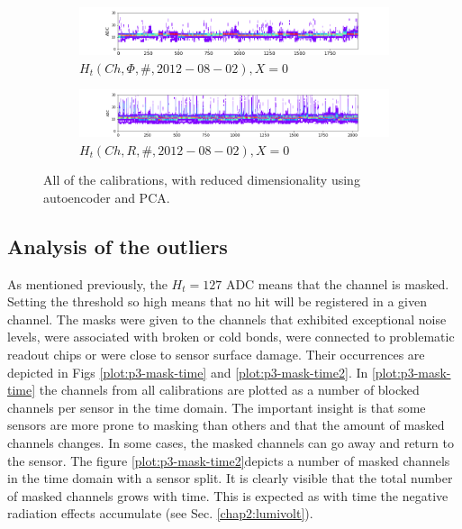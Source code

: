 \begin{figure}
    \centering
    
    \begin{subfigure}[b]{\textwidth}
    \includegraphics[width=\linewidth]{figures/chapter4/calib_analysis/P2-only-good-R.png}
    \caption{$H_t(Ch, \Phi, \#, 2012-08-02), X=0$}
   \label{plot:only_good_r}
  \end{subfigure}
  
  \begin{subfigure}[b]{\textwidth}
    \includegraphics[width=\linewidth]{figures/chapter4/calib_analysis/P2-only-good-phi.png}
    \caption{$H_t(Ch, R, \#, 2012-08-02), X=0$}
   \label{plot:only_good_phi}
  \end{subfigure}
      \caption[All calond]{All of the calibrations, with reduced dimensionality using autoencoder and PCA.}
    \label{plot:only_good_all}
  
  \end{figure}

\subsection{Analysis of the outliers}
\label{chap4:masks}
As mentioned previously, the $H_t=127$ ADC means that the channel is masked.
Setting the threshold so high means that no hit will be registered in a given channel.
The masks were given to the channels that exhibited exceptional noise levels, were associated with broken or cold bonds, were connected to problematic readout chips or were close to sensor surface damage.
Their occurrences are depicted in Figs \ref{plot:p3-mask-time} and \ref{plot:p3-mask-time2}.
In  \ref{plot:p3-mask-time} the channels from all calibrations are plotted as a number of blocked channels per sensor in the time domain.
The important insight is that some sensors are more prone to masking than others and that the amount of masked channels changes.
In some cases, the masked channels can go away and return to the sensor.
The figure \ref{plot:p3-mask-time2}depicts a number of masked channels in the time domain with a sensor split.
It is clearly visible that the total number of masked channels grows with time.
This is expected as with time the negative radiation effects accumulate (see Sec. \ref{chap2:lumivolt}).

